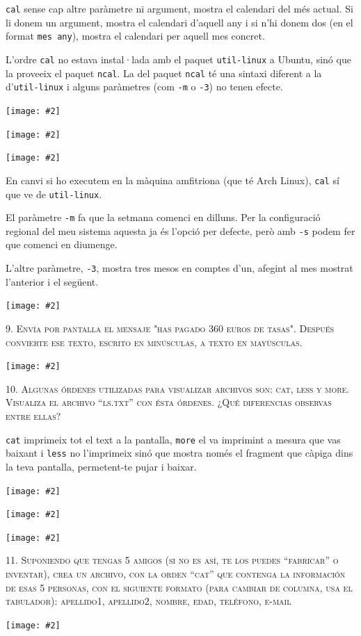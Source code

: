 \documentclass[a4paper,12pt]{article}
\newcommand{\mygraphic}[2][height=0.45\textheight]{\begin{center}
		\centering\texttt{[image: \#2]}\par
\end{center}}
\begin{document}
\texttt{cal} sense cap altre paràmetre ni argument, mostra el calendari del més actual. Si li donem un argument, mostra el calendari d'aquell any i si n'hi donem dos (en el format \texttt{mes any}), mostra el calendari per aquell mes concret.

L'ordre \texttt{cal} no estava instal·lada amb el paquet \texttt{util-linux} a Ubuntu, sinó que la proveeix el paquet \texttt{ncal}. La del paquet \texttt{ncal} té una sintaxi diferent a la d'\texttt{util-linux} i alguns paràmetres (com \texttt{-m} o \texttt{-3}) no tenen efecte.

\mygraphic{imatges/8a.png}
\mygraphic{imatges/8b.png}
\mygraphic{imatges/8c.png}

En canvi si ho executem en la màquina amfitriona (que té Arch Linux), \texttt{cal} sí que ve de \texttt{util-linux}.

El paràmetre \texttt{-m} fa que la setmana comenci en dilluns. Per la configuració regional del meu sistema aquesta ja és l'opció per defecte, però amb \texttt{-s} podem fer que comenci en diumenge.

L'altre paràmetre, \texttt{-3}, mostra tres mesos en comptes d'un, afegint al mes mostrat l'anterior i el següent.

\mygraphic[width=\textwidth]{imatges/8d.png}

\newpage
\textsc{9. Envía por pantalla el mensaje "has pagado 360 euros de tasas". Después convierte ese texto, escrito en minúsculas, a texto en mayúsculas.}
\mygraphic{imatges/9.png}

\newpage
\textsc{10. Algunas órdenes utilizadas para  visualizar archivos son: cat, less y more. Visualiza el archivo “ls.txt” con ésta órdenes. ¿Qué diferencias observas entre ellas?}

\texttt{cat} imprimeix tot el text a la pantalla, \texttt{more} el va imprimint a mesura que vas baixant i \texttt{less} no l'imprimeix sinó que mostra només el fragment que càpiga dins la teva pantalla, permetent-te pujar i baixar.

\mygraphic{imatges/10a.png}
\mygraphic{imatges/10b.png}
\mygraphic{imatges/10c.png}

\newpage
\textsc{11. Suponiendo que tengas 5 amigos (si no es así, te los puedes “fabricar” o inventar), crea un archivo, con la orden “cat” que contenga la información de esas 5 personas, con el siguiente formato (para cambiar de columna, usa el tabulador):
apellido1, apellido2, nombre, edad, teléfono, e-mail}
\mygraphic{imatges/11.png}
\end{document}

